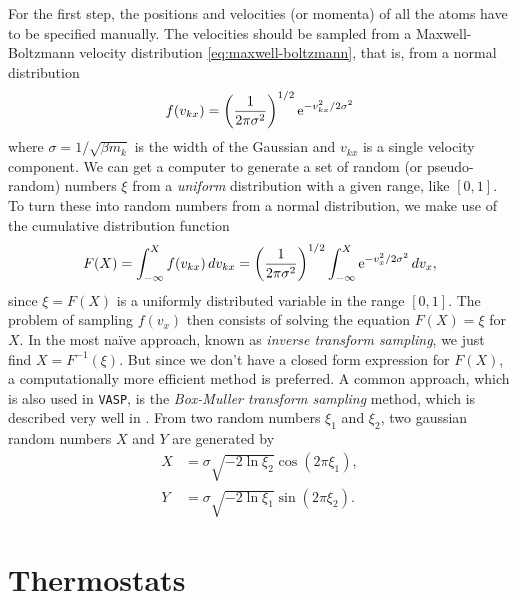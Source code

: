 \documentclass[11pt,bibliography=totoc,index=totoc]{scrbook}   %
\newcommand{\vasp}{{\texttt{VASP}}} %
\begin{document}
For the first step, the positions and velocities (or momenta) of all the atoms have to be specified manually. 
The velocities should be sampled from a Maxwell-Boltzmann velocity distribution \eqref{eq:maxwell-boltzmann},
that is, from a normal distribution
\begin{equation}
    f(v_{kx}) = \left(\frac{1}{2\pi\sigma^2}\right)^{1/2} \mathrm{e}^{-v_{kx}^2/2\sigma^2}
  \label{eq:normal-dist}
\end{equation}
where $\sigma=1/\sqrt{\beta m_k}$ is the width of the Gaussian and $v_{kx}$ is a single velocity component.
We can get a computer to generate a set of random (or pseudo-random) numbers $\xi$ from a \emph{uniform} distribution with a given range, like $[0,1]$.
To turn these into random numbers from a normal distribution, we make use of the cumulative distribution function
\begin{equation}
    F(X) = \int_{-\infty}^X f(v_{kx})\,dv_{kx} = \left(\frac{1}{2\pi\sigma^2}\right)^{1/2} \int_{-\infty}^X \mathrm{e}^{-v_x^2/2\sigma^2} \,dv_x,
    \label{eq:CDF}
\end{equation}
since $\xi = F(X)$ is a uniformly distributed variable in the range $[0,1]$. 
The problem of sampling $f(v_x)$ then consists of solving the equation $F(X)=\xi$ for $X$.
In the most naïve approach, known as \emph{inverse transform sampling}, we just find $X=F^{-1}(\xi)$.
But since we don't have a closed form expression for $F(X)$, a computationally more efficient method is preferred. 
A common approach, which is also used in {\vasp}, %
is the \emph{Box-Muller transform sampling} method, which is
described very well in \cite[101]{Tuckerman:2010}. 
From two random numbers $\xi_1$ and $\xi_2$, two gaussian random numbers $X$ and $Y$ are generated by
\begin{align}
    X &= \sigma \sqrt{-2\ln\xi_2} \cos(2\pi\xi_1), \\
    Y &= \sigma \sqrt{-2\ln\xi_1} \sin(2\pi\xi_2).
  \label{eq:box-muller-sampling}
\end{align}


%
\section{Thermostats}\label{sec:thermostats}
%
\end{document}
